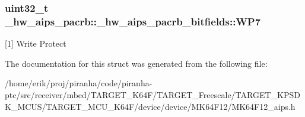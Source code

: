 \subsubsection[{\texorpdfstring{W\+P7}{WP7}}]{\setlength{\rightskip}{0pt plus 5cm}uint32\+\_\+t \+\_\+hw\+\_\+aips\+\_\+pacrb\+::\+\_\+hw\+\_\+aips\+\_\+pacrb\+\_\+bitfields\+::\+W\+P7}\hypertarget{struct__hw__aips__pacrb_1_1__hw__aips__pacrb__bitfields_aa5a5555c1d2bbfb4b7daad9c158549c4}{}\label{struct__hw__aips__pacrb_1_1__hw__aips__pacrb__bitfields_aa5a5555c1d2bbfb4b7daad9c158549c4}
\mbox{[}1\mbox{]} Write Protect 

The documentation for this struct was generated from the following file\+:\begin{DoxyCompactItemize}
\item 
/home/erik/proj/piranha/code/piranha-\/ptc/src/receiver/mbed/\+T\+A\+R\+G\+E\+T\+\_\+\+K64\+F/\+T\+A\+R\+G\+E\+T\+\_\+\+Freescale/\+T\+A\+R\+G\+E\+T\+\_\+\+K\+P\+S\+D\+K\+\_\+\+M\+C\+U\+S/\+T\+A\+R\+G\+E\+T\+\_\+\+M\+C\+U\+\_\+\+K64\+F/device/device/\+M\+K64\+F12/M\+K64\+F12\+\_\+aips.\+h\end{DoxyCompactItemize}
